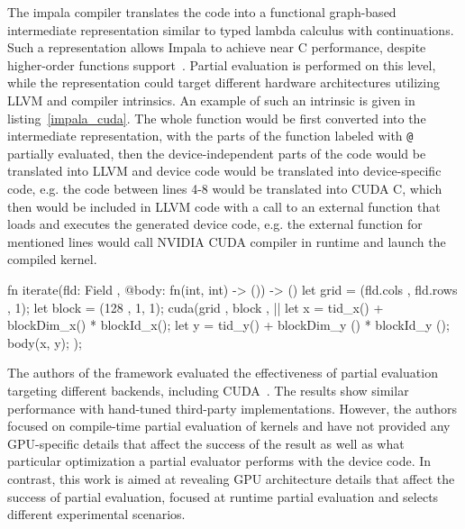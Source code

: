 The impala compiler translates the code into a functional graph-based intermediate representation similar to typed lambda calculus with continuations. Such a representation allows Impala to achieve near C performance, despite higher-order functions support~\cite{Thorin}.
Partial evaluation is performed on this level, while the representation could target different hardware architectures utilizing LLVM and compiler intrinsics.
An example of such an intrinsic is given in listing~\ref{impala_cuda}.
The whole function would be first converted into the intermediate representation, with the parts of the function labeled with \lstinline{@} partially evaluated, then the device-independent parts of the code would be translated into LLVM and device code would be translated into device-specific code, e.g. the code between lines 4-8 would be translated into CUDA C, which then would be included in LLVM code with a call to an external function that loads and executes the generated device code, e.g. the external function for mentioned lines would call NVIDIA CUDA compiler in runtime and launch the compiled kernel.

\begin{code}[language=Rust, label = impala_cuda, caption=Impala GPU-accelerated loop]
fn iterate(fld: Field , @body: fn(int, int) -> ()) -> () {
    let grid = (fld.cols , fld.rows , 1);
    let block = (128 , 1, 1);
    cuda(grid , block , || {
        let x = tid_x() + blockDim_x() * blockId_x();
        let y = tid_y() + blockDim_y () * blockId_y ();
        body(x, y);
    });
}
\end{code}

The authors of the framework evaluated the effectiveness of partial evaluation targeting different backends, including CUDA~\cite{LeiBa,OnlinePe}. The results show similar performance with hand-tuned third-party implementations. However, the authors focused on compile-time partial evaluation of kernels and have not provided any GPU-specific details that affect the success of the result as well as what particular optimization a partial evaluator performs with the device code. In contrast, this work is aimed at revealing GPU architecture details that affect the success of partial evaluation, focused at runtime partial evaluation and selects different experimental scenarios.

